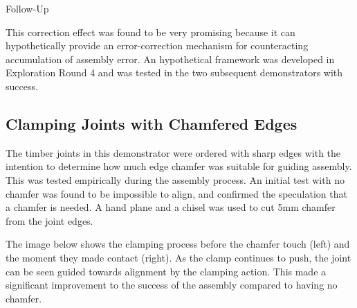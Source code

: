 Follow-Up

This correction effect was found to be very promising because it can hypothetically provide an error-correction mechanism for counteracting accumulation of assembly error. An hypothetical framework was developed in Exploration Round 4  and was tested in the two subsequent demonstrators with success.

\subsection{Clamping Joints with Chamfered Edges}
\label{subsection:exploration-2-clamping-joints-with-chamfered-edges}

The timber joints in this demonstrator were ordered with sharp edges with the intention to determine how much edge chamfer was suitable for guiding assembly. This was tested empirically during the assembly process. 
An initial test with no chamfer was found to be impossible to align, and confirmed the speculation that a chamfer is needed. A hand plane and a chisel was used to cut 5mm chamfer from the joint edges.

The image below shows the clamping process before the chamfer touch (left) and the moment they made contact (right). As the clamp continues to push, the joint can be seen guided towards alignment by the clamping action. This made a significant improvement to the success of the assembly compared to having no chamfer.

